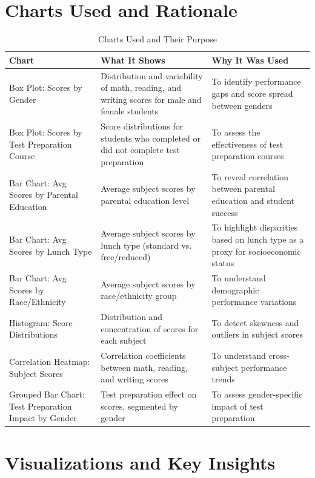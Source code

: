 \documentclass[12pt]{article}
\begin{document}
\section{Charts Used and Rationale}

\begin{table}[H]
\centering
\caption{Charts Used and Their Purpose}
\begin{tabular}{p{4cm} p{5cm} p{5cm}}
\toprule
\textbf{Chart} & \textbf{What It Shows} & \textbf{Why It Was Used} \\
\midrule
Box Plot: Scores by Gender & Distribution and variability of math, reading, and writing scores for male and female students & To identify performance gaps and score spread between genders \\
Box Plot: Scores by Test Preparation Course & Score distributions for students who completed or did not complete test preparation & To assess the effectiveness of test preparation courses \\
Bar Chart: Avg Scores by Parental Education & Average subject scores by parental education level & To reveal correlation between parental education and student success \\
Bar Chart: Avg Scores by Lunch Type & Average subject scores by lunch type (standard vs. free/reduced) & To highlight disparities based on lunch type as a proxy for socioeconomic status \\
Bar Chart: Avg Scores by Race/Ethnicity & Average subject scores by race/ethnicity group & To understand demographic performance variations \\
Histogram: Score Distributions & Distribution and concentration of scores for each subject & To detect skewness and outliers in subject scores \\
Correlation Heatmap: Subject Scores & Correlation coefficients between math, reading, and writing scores & To understand cross-subject performance trends \\
Grouped Bar Chart: Test Preparation Impact by Gender & Test preparation effect on scores, segmented by gender & To assess gender-specific impact of test preparation \\
\bottomrule
\end{tabular}
\end{table}

\section{Visualizations and Key Insights}
\end{document}
